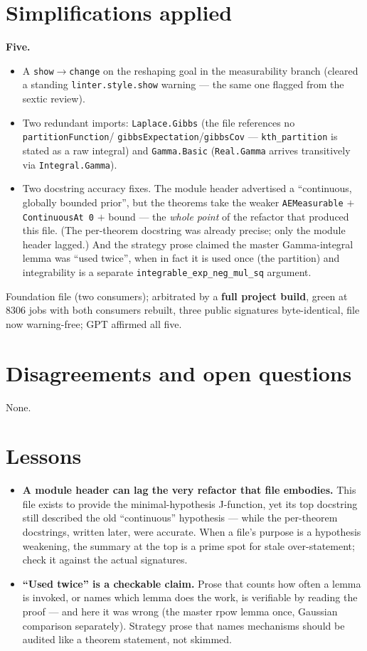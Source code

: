 \documentclass[11pt]{article}
\begin{document}
\section{Simplifications applied}
\textbf{Five.}
\begin{itemize}[noitemsep]
  \item A \texttt{show}$\to$\texttt{change} on the reshaping goal in the measurability branch (cleared a
    standing \texttt{linter.style.show} warning --- the same one flagged from the sextic review).
  \item Two redundant imports: \texttt{Laplace.Gibbs} (the file references no \texttt{partitionFunction}/%
    \texttt{gibbsExpectation}/\texttt{gibbsCov} --- \texttt{kth\_partition} is stated as a raw integral) and
    \texttt{Gamma.Basic} (\texttt{Real.Gamma} arrives transitively via \texttt{Integral.Gamma}).
  \item Two docstring accuracy fixes. The module header advertised a ``continuous, globally bounded prior'',
    but the theorems take the weaker \texttt{AEMeasurable} $+$ \texttt{ContinuousAt 0} $+$ bound --- the
    \emph{whole point} of the refactor that produced this file. (The per-theorem docstring was already precise;
    only the module header lagged.) And the strategy prose claimed the master Gamma-integral lemma was ``used
    twice'', when in fact it is used once (the partition) and integrability is a separate
    \texttt{integrable\_exp\_neg\_mul\_sq} argument.
\end{itemize}
Foundation file (two consumers); arbitrated by a \textbf{full project build}, green at $8306$ jobs with both
consumers rebuilt, three public signatures byte-identical, file now warning-free; GPT affirmed all five.

\section{Disagreements and open questions}
None.

\section{Lessons}
\begin{itemize}[noitemsep]
  \item \textbf{A module header can lag the very refactor that file embodies.} This file exists to provide the
    minimal-hypothesis J-function, yet its top docstring still described the old ``continuous'' hypothesis ---
    while the per-theorem docstrings, written later, were accurate. When a file's purpose is a hypothesis
    weakening, the summary at the top is a prime spot for stale over-statement; check it against the actual
    signatures.
  \item \textbf{``Used twice'' is a checkable claim.} Prose that counts how often a lemma is invoked, or names
    which lemma does the work, is verifiable by reading the proof --- and here it was wrong (the master rpow
    lemma once, Gaussian comparison separately). Strategy prose that names mechanisms should be audited like a
    theorem statement, not skimmed.
\end{itemize}
\end{document}
